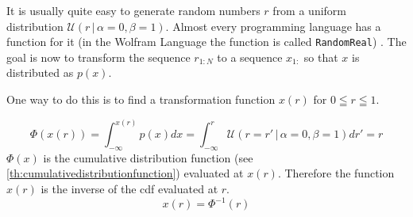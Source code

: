 \documentclass{tstextbook}
\begin{document}
It is usually quite easy to generate random numbers $r$ from a uniform distribution $\mathcal{U}(r\,\vert\,\alpha=0,\beta=1)$. Almost every programming language has a function for it (in the Wolfram Language the function is called \texttt{RandomReal}) . The goal is now to transform the sequence $r_{1:N}$ to a sequence $x_{1:}$ so that $x$ is distributed as $p(x)$.

One way to do this is to find a transformation function $x(r)$ for $0\leqq r \leqq 1$.

\begin{equation}
  \Phi(x(r))=\int_{-\infty}^{x(r)}p(x)dx = \int_{-\infty}^{r}\mathcal{U}(r=r'\,\vert\,\alpha=0,\beta=1)dr'=r
\end{equation}
$\Phi(x)$ is the cumulative distribution function (see \ref{th:cumulativedistributionfunction}) evaluated at $x(r)$. Therefore the function $x(r)$ is the inverse of the cdf evaluated at $r$.
\begin{equation}
  x(r) = \Phi^{-1}(r)
\end{equation}
\end{document}
